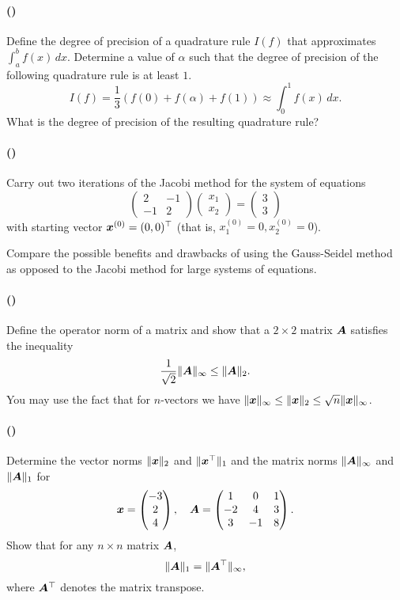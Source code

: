 \documentclass{article}
\newcounter{problems}
\newcommand{\problem}[1]{\paragraph{(\theproblems)}\addtocounter{problems}{1}\label{#1}}
\newcommand{\marks}[2][0mm]{\hspace{30mm}\mbox{}\vskip #1\hspace{-30mm}\hfill{\sf [#2 marks]}\\[-\baselineskip]}
\renewcommand{\marks}[2][0mm]{\hspace{30mm}\mbox{}\vskip #1\hspace{-30mm}\hfill{\sf [#2 marks]}\\[-\baselineskip]}
\begin{document}
\newpage
\mbox{}
\newpage
 
\problem{p4} Define the degree of precision of a quadrature rule 
$I(f)$ that approximates $\int_a^b f(x)\,dx$. Determine a value of 
$\alpha$ such that the degree of precision of the following quadrature rule is at least $1$.
\begin{equation*} 
I(f)= \frac 13 \left( f(0)+ f(\alpha) +f(1)\right)\approx \int_0^1  f(x)\,dx.  
\end{equation*}
What is the degree of precision of the resulting quadrature rule? \marks{3} 

\newpage
\mbox{}
\newpage

\problem{p5}
Carry out two iterations of the Jacobi method for the system of equations
\begin{equation*}
  \begin{pmatrix} 2 & -1\\ -1 & 2 \end{pmatrix} \begin{pmatrix} x_1\\ x_2 \end{pmatrix} = \begin{pmatrix} 3\\3\end{pmatrix}
\end{equation*}
with starting vector $\bm{x}^{(0)} = (0,0)^{\top}$ (that is, $x_1^{(0)}=0, x_2^{(0)}=0$).

Compare the possible benefits and drawbacks of using the Gauss-Seidel method as opposed to the Jacobi method for large systems of equations.\marks{3}

\newpage
\mbox{}
\newpage

\problem{p6}
Define the operator norm of a matrix and show that a $2\times 2$ matrix $\bm{A}$ satisfies the inequality
\begin{equation*}
\frac{1}{\sqrt{2}}\Vert {\bm{A}}\Vert_\infty \leq \Vert {\bm{A}}\Vert_2.
\end{equation*} 
You may use the fact that for $n$-vectors we have $\Vert {\bm{x}}\Vert_\infty\leq \Vert {\bm{x}}\Vert_2\leq \sqrt{n}\Vert {\bm{x}}\Vert_\infty$. \marks{2}

\newpage
\mbox{}
\newpage

\problem{p7}
Determine the vector norms $\Vert {\bm{x}}\Vert_2$ and $\Vert {\bm{x}^{\top}}\Vert_1$ and the matrix norms $\Vert {\bm{A}}\Vert_\infty$ and $\Vert {\bm{A}}\Vert_1$ for
\begin{equation*}
  \bm{x} = \begin{pmatrix} -3\\ 2\\ 4 \end{pmatrix}, \quad
\bm{A} =  \begin{pmatrix}
  1 & 0 & 1\\
  -2 & 4 & 3\\
  3 & -1 & 8
\end{pmatrix}.
\end{equation*}
Show that for any $n\times n$ matrix $\bm{A}$, 
\begin{equation*}
  \Vert {\bm{A}}\Vert_1 = \Vert {\bm{A}^{\top}}\Vert_\infty,
\end{equation*}
where $\bm{A}^{\top}$ denotes the matrix transpose.
\marks{3}

\newpage
\mbox{}
\newpage
\end{document}

